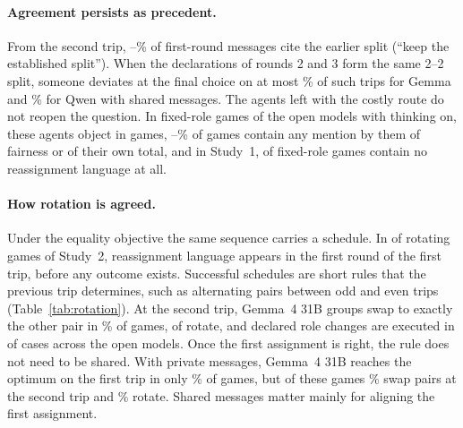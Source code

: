 \documentclass[11pt]{article}
\begin{document}
\begin{table}[t]
\centering\small
\resizebox{\columnwidth}{!}{}
\caption{The first trip and its sequel under total cost (shared messages, thinking on; percentages of games, except the last two columns). Same opening: two or more identical round-1 assignments and no rival. Overshoot: three or more agents switch in one round and the count on $A$ crosses two. Addressee had moved: named switch requests whose addressee had already switched in the same round. Precedent: first-round messages of trips 2--8 that cite earlier trips. Lexical and structural measures; exploratory.}
\label{tab:process}
\end{table}

\paragraph{Agreement persists as precedent.}
From the second trip, \PrecLo--\PrecHi\% of first-round messages cite the earlier split (``keep the established split''). When the declarations of rounds 2 and 3 form the same 2--2 split, someone deviates at the final choice on at most \DefectGemmaMax\% of such trips for Gemma and \DefectQwenMax\% for Qwen with shared messages. The agents left with the costly route do not reopen the question. In \FixedGames{} fixed-role games of the open models with thinking on, these agents object in \FixedObject{} games, \FixedBurdenLo--\FixedBurdenHi\% of games contain any mention by them of fairness or of their own total, and in Study~1, \SOneSocFixedNoLang{} of \SOneSocFixed{} fixed-role games contain no reassignment language at all.

\paragraph{How rotation is agreed.}
Under the equality objective the same sequence carries a schedule. In \PlanFairTextRoundOne{} of \PlanFairTextRot{} rotating games of Study~2, reassignment language appears in the first round of the first trip, before any outcome exists. Successful schedules are short rules that the previous trip determines, such as alternating pairs between odd and even trips (Table~\ref{tab:rotation}). At the second trip, Gemma~4 31B groups swap to exactly the other pair in \RotGThirtyOneSwap\% of games, \RotGThirtyOne{} of \RotGThirtyOneGames{} rotate, and declared role changes are executed in \IntendedChangesExec{} of \IntendedChanges{} cases across the open models. Once the first assignment is right, the rule does not need to be shared. With private messages, Gemma~4 31B reaches the optimum on the first trip in only \RotPrivGThirtyOneTripOne\% of games, but of these \RotPrivGThirtyOneN{} games \RotPrivGThirtyOneSwap\% swap pairs at the second trip and \RotPrivGThirtyOneRot\% rotate. Shared messages matter mainly for aligning the first assignment.
\end{document}
